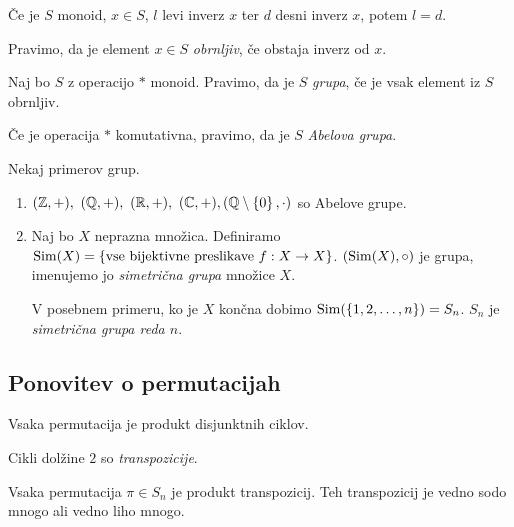\begin{trditev}
    Če je $S$ monoid, $x \in S$, $l$ levi inverz $x$ ter $d$ desni inverz $x$, potem $l=d$.
\end{trditev}

\begin{definicija}
    Pravimo, da je element $x \in S$ \emph{obrnljiv}, če obstaja inverz od $x$.
\end{definicija}

\begin{definicija}
    Naj bo $S$ z operacijo $*$ monoid. Pravimo, da je $S$ \emph{grupa}, če je vsak element iz $S$ obrnljiv.

    Če je operacija $*$ komutativna, pravimo, da je $S$ \emph{Abelova grupa}.
\end{definicija}

\begin{zgled}
    Nekaj primerov grup.
    \begin{enumerate}
        \item $(\ZZ, +), \ (\QQ, +), \ (\RR, +), \ (\CC, +), (\QQ \setminus \set{0}, \cdot)$ so Abelove grupe.
        \item Naj bo $X$ neprazna množica. Definiramo $\operatorname{Sim}(X) = \left\{\text{vse bijektivne preslikave } f: X \to X\right\}$. $(\operatorname{Sim}(X), \circ)$ je grupa, imenujemo jo \emph{simetrična grupa} množice $X$.
        
        V posebnem primeru, ko je $X$ končna dobimo $\operatorname{Sim}(\left\{1, 2, \ldots, n\right\}) = S_n$. $S_n$ je \emph{simetrična grupa reda $n$}.
    \end{enumerate}
\end{zgled}

\subsection{Ponovitev o permutacijah}
\begin{izrek}
    Vsaka permutacija je produkt disjunktnih ciklov.
\end{izrek}

\begin{definicija}
    Cikli dolžine $2$ so \emph{transpozicije}.
\end{definicija}

\begin{trditev}
    Vsaka permutacija $\pi \in S_n$ je produkt transpozicij. Teh transpozicij je vedno sodo mnogo ali vedno liho mnogo.
\end{trditev}

